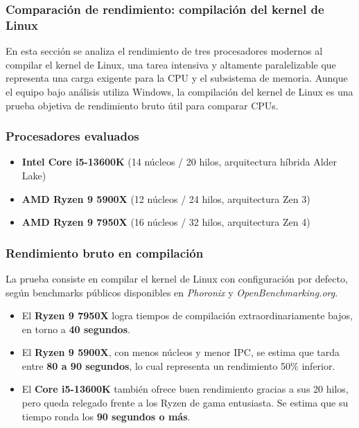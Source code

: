 
\subsubsection*{Comparación de rendimiento: compilación del kernel de Linux}

En esta sección se analiza el rendimiento de tres procesadores modernos al compilar el kernel de Linux, una tarea intensiva y altamente paralelizable que representa una carga exigente para la CPU y el subsistema de memoria. Aunque el equipo bajo análisis utiliza Windows, la compilación del kernel de Linux es una prueba objetiva de rendimiento bruto útil para comparar CPUs.

\subsubsection*{Procesadores evaluados}

\begin{itemize}
  \item \textbf{Intel Core i5-13600K} (14 núcleos / 20 hilos, arquitectura híbrida Alder Lake)
  \item \textbf{AMD Ryzen 9 5900X} (12 núcleos / 24 hilos, arquitectura Zen 3)
  \item \textbf{AMD Ryzen 9 7950X} (16 núcleos / 32 hilos, arquitectura Zen 4)
\end{itemize}

\subsubsection*{Rendimiento bruto en compilación}

La prueba consiste en compilar el kernel de Linux con configuración por defecto, según benchmarks públicos disponibles en \textit{Phoronix} y \textit{OpenBenchmarking.org}.

\begin{itemize}
  \item El \textbf{Ryzen 9 7950X} logra tiempos de compilación extraordinariamente bajos, en torno a \textbf{40 segundos}.
  \item El \textbf{Ryzen 9 5900X}, con menos núcleos y menor IPC, se estima que tarda entre \textbf{80 a 90 segundos}, lo cual representa un rendimiento 50\% inferior.
  \item El \textbf{Core i5-13600K} también ofrece buen rendimiento gracias a sus 20 hilos, pero queda relegado frente a los Ryzen de gama entusiasta. Se estima que su tiempo ronda los \textbf{90 segundos o más}.
\end{itemize}

